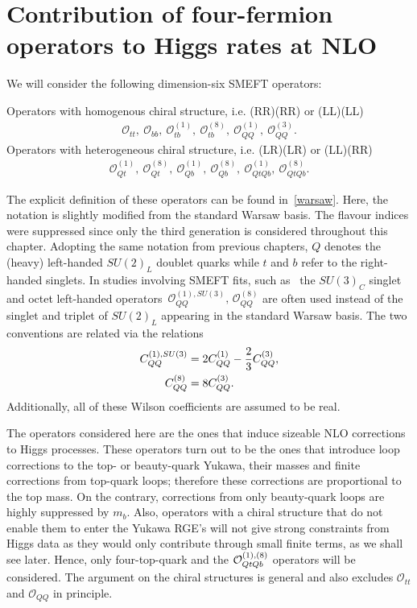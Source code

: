 \section{Contribution of four-fermion operators to Higgs rates at NLO \label{sec:HiggsCalc}}
We will consider the following dimension-six SMEFT operators:
%
\begin{tcolorbox}[title=Four-heavy-quark SMEFT operators modifying Higgs rates at NLO,
	title filled=false,
	colback=Mahogany!5!white,
	colframe=Mahogany ]
	Operators with homogenous chiral structure, i.e.  (RR)(RR) or (LL)(LL)
	\begin{align}
		\mathcal{O}_{tt},\  \mathcal{O}_{bb},\ \mathcal{O}_{tb}^{(1)}, \ \mathcal{O}_{tb}^{(8)}, \  \mathcal{O}_{QQ}^{(1)},\   \mathcal{O}_{QQ}^{(3)}.
		\label{box:heavyq}
	\end{align}
	Operators with heterogeneous chiral structure, i.e.  (LR)(LR) or (LL)(RR)
	\begin{align}
		\mathcal{O}_{Qt}^{(1)},\ \mathcal{O}_{Qt}^{(8)},\ \mathcal{O}_{Qb}^{(1)},\ \mathcal{O}_{Qb}^{(8)},\ \mathcal{O}^{(1)}_{QtQb},\ \mathcal{O}^{(8)}_{QtQb}.
		\label{box:heavyqs}
	\end{align}
\end{tcolorbox}
The explicit definition of these operators can be found in~\autoref{warsaw}. Here, the notation is slightly modified from the standard Warsaw basis. The flavour indices were suppressed since only the third generation is considered throughout this chapter. Adopting the same notation from previous chapters, $Q$ denotes the (heavy) left-handed  $SU(2)_L$ doublet quarks while  $t$ and $b$ refer to the right-handed singlets.  In studies involving SMEFT fits, such as~\cite{Ethier:2021bye} the $SU(3)_C$ singlet and octet left-handed operators~$\mathcal{O}_{QQ}^{(1),SU(3)},\,\mathcal{O}_{QQ}^{(8)}$ are often used instead of the singlet and triplet of $SU(2)_L$ appearing in the standard Warsaw basis. The two conventions are related via the relations
\begin{align}
	C_{QQ}^{(1),SU(3)} &= 2 C_{QQ}^{(1)} -\frac{2}{3} C_{QQ}^{(3)}, \nonumber \\
	C_{QQ}^{(8)} &= 8 C_{QQ}^{(3)}.
\end{align}
Additionally, all of these Wilson coefficients are assumed to be real.\\
\par  The operators considered here are the ones that induce sizeable NLO corrections to Higgs processes. These operators turn out to be the ones that introduce loop corrections to the top- or beauty-quark Yukawa, their masses and finite corrections from top-quark loops; therefore these corrections are proportional to the top mass. On the contrary, corrections from only beauty-quark loops are highly suppressed by $m_b$.  Also, operators with a chiral structure that do not enable them to enter the Yukawa RGE's will not give strong constraints from Higgs data as they would only contribute through small finite terms, as we shall see later.  Hence, only four-top-quark and the  ${\cal O}_{QtQb}^{(1),(8)}$ operators will be considered. The argument on the chiral structures is general and also excludes $\mathcal{O}_{tt}$ and $\mathcal{O}_{QQ}$ in principle.\\
